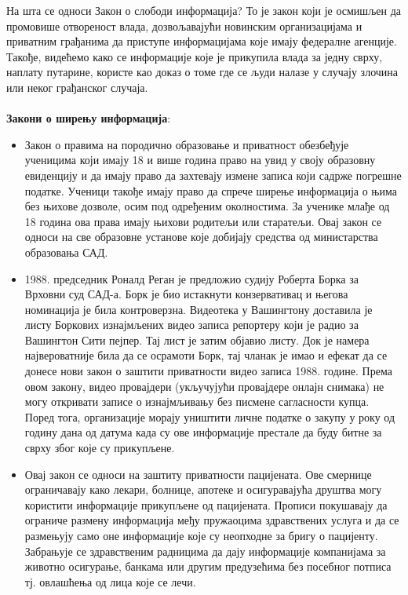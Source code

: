 \documentclass{article}
\begin{document}
На шта се односи Закон о слободи информација? То је закон који је осмишљен да промовише отвореност влада, дозвољавајући новинским организацијама и приватним грађанима да приступе информацијама које имају федералне агенције. Такође, видећемо како се информације које је прикупила влада за једну сврху, наплату путарине, користе као доказ о томе где се људи налазе у случају злочина или неког грађанског случаја.
\\\\
\textbf{Закони о ширењу информација}:
\begin{itemize}
  \item Закон о правима на породично образовање и приватност обезбеђује ученицима који имају 18 и више година право на увид у своју образовну евиденцију и да имају право да захтевају измене записа који садрже погрешне податке. Ученици такође имају право да спрече ширење информација о њима без њихове дозволе, осим под одређеним околностима. За ученике млађе од 18 година ова права имају њихови родитељи или старатељи. Овај закон се односи на све образовне установе које добијају средства од министарства образовања САД.
  \item 1988. председник Роналд Реган је предложио судију Роберта Борка за Врховни суд САД-а. Борк је био истакнути конзервативац и
  његова номинација је била контроверзна. Видеотека у Вашингтону доставила је листу Боркових изнајмљених видео записа репортеру који је радио за Вашингтон Сити пејпер. Тај лист је затим објавио листу. Док је намера највероватније била да се осрамоти Борк, тај чланак је имао и ефекат да се донесе нови закон о заштити приватности видео записа 1988. године. Према овом закону, видео провајдери (укључујући провајдере онлајн снимака) не могу откривати записе о изнајмљивању без писмене сагласности купца. Поред тога, организације морају уништити личне податке о закупу у року од годину дана од датума када су ове информације престале да буду битне за сврху због које су прикупљене.
  \item Овај закон се односи на заштиту приватности пацијената. Ове смернице ограничавају како лекари, болнице, апотеке и осигуравајућа друштва могу користити информације прикупљене од пацијената. Прописи покушавају да ограниче размену информација међу пружаоцима здравствених услуга и да се размењују само оне информације које су неопходне за бригу о пацијенту. Забрањује се здравственим радницима да дају информације компанијама за животно осигурање, банкама или другим предузећима без посебног потписа тј. овлашћења од лица које се лечи.

\end{itemize}
\end{document}
